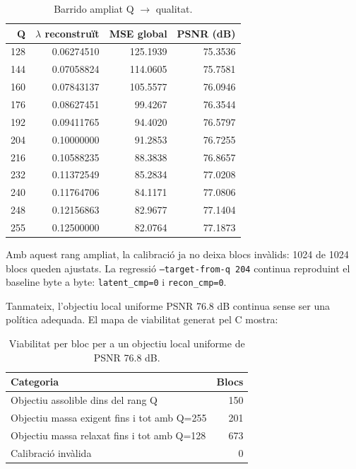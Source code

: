 \documentclass[11pt,a4paper]{article}
\begin{document}
\begin{table}[H]
\centering
\begin{tabular}{rrrr}
\toprule
\textbf{Q} & \textbf{$\lambda$ reconstruït} & \textbf{MSE global} & \textbf{PSNR (dB)} \\
\midrule
128 & 0.06274510 & 125.1939 & 75.3536 \\
144 & 0.07058824 & 114.0605 & 75.7581 \\
160 & 0.07843137 & 105.5577 & 76.0946 \\
176 & 0.08627451 & 99.4267 & 76.3544 \\
192 & 0.09411765 & 94.4020 & 76.5797 \\
204 & 0.10000000 & 91.2853 & 76.7255 \\
216 & 0.10588235 & 88.3838 & 76.8657 \\
232 & 0.11372549 & 85.2834 & 77.0208 \\
240 & 0.11764706 & 84.1171 & 77.0806 \\
248 & 0.12156863 & 82.9677 & 77.1404 \\
255 & 0.12500000 & 82.0764 & 77.1873 \\
\bottomrule
\end{tabular}
\caption{Barrido ampliat Q $\rightarrow$ qualitat.}
\end{table}

Amb aquest rang ampliat, la calibració ja no deixa blocs invàlids: 1024 de 1024 blocs queden ajustats. La regressió \texttt{--target-from-q 204} continua reproduint el baseline byte a byte: \texttt{latent\_cmp=0} i \texttt{recon\_cmp=0}.

Tanmateix, l'objectiu local uniforme PSNR 76.8 dB continua sense ser una política adequada. El mapa de viabilitat generat pel C mostra:

\begin{table}[H]
\centering
\begin{tabular}{lr}
\toprule
\textbf{Categoria} & \textbf{Blocs} \\
\midrule
Objectiu assolible dins del rang Q & 150 \\
Objectiu massa exigent fins i tot amb Q=255 & 201 \\
Objectiu massa relaxat fins i tot amb Q=128 & 673 \\
Calibració invàlida & 0 \\
\bottomrule
\end{tabular}
\caption{Viabilitat per bloc per a un objectiu local uniforme de PSNR 76.8 dB.}
\end{table}
\end{document}
